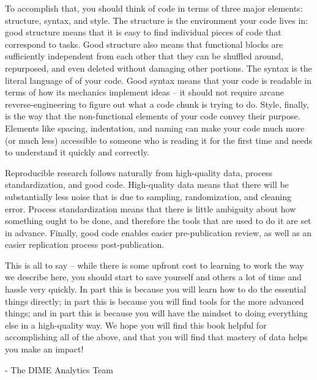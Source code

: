 To accomplish that, you should think of code in terms of three major elements: structure, syntax, and style.
The structure is the environment your code lives in:
good structure means that it is easy to find individual pieces of code that correspond to tasks.
Good structure also means that functional blocks are sufficiently independent from each other
that they can be shuffled around, repurposed, and even deleted without damaging other portions.
The syntax is the literal language of of your code.
Good syntax means that your code is readable in terms of how its mechanics implement ideas --
it should not require arcane reverse-engineering to figure out what a code chunk is trying to do.
Style, finally, is the way that the non-functional elements of your code convey their purpose.
Elements like spacing, indentation, and naming can make your code much more (or much less)
accessible to someone who is reading it for the first time and needs to understand it quickly and correctly.

Reproducible research follows naturally from high-quality data, process standardization, and good code.
High-quality data means that there will be substantially less noise
that is due to sampling, randomization, and cleaning error.
Process standardization means that there is little ambiguity about how something ought to be done,
and therefore the tools that are used to do it are set in advance.
Finally, good code enables easier pre-publication review,
as well as an easier replication process post-publication.


This is all to say -- while there is some upfront cost to learning to work the way we describe here,
you should start to save yourself and others a lot of time and hassle very quickly.
In part this is because you will learn how to do the essential things directly;
in part this is because you will find tools for the more advanced things;
and in part this is because you will have the mindset to doing everything else in a high-quality way.
We hope you will find this book helpful for accomplishing all of the above,
and that you will find that mastery of data helps you make an impact!

- The DIME Analytics Team

\mainmatter
